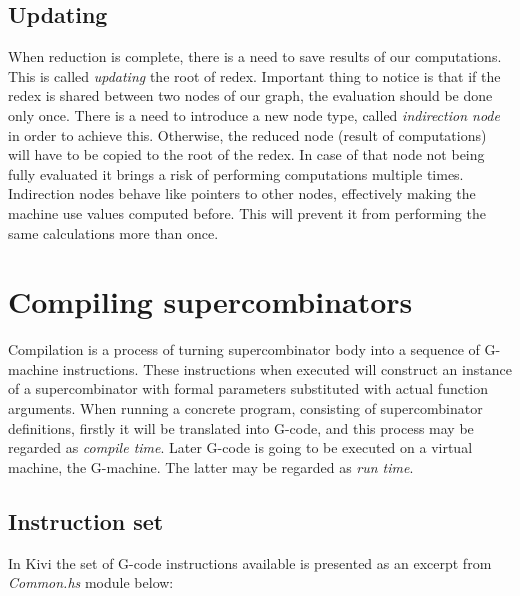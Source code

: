 \documentclass[12pt,a4paper]{report}
\begin{document}
\subsection{Updating}
\label{sec:updating}
When reduction is complete, there is a need to save results of our
computations. This is called \textit{updating} the root of redex. Important
thing to notice is that if the redex is shared between two nodes of our graph,
the evaluation should be done only once. There is a need to introduce a new
node type, called \textit{indirection node} in order to achieve this.
Otherwise, the reduced node (result of computations) will have to be copied to
the root of the redex. In case of that node not being fully evaluated it brings
a risk of performing computations multiple times. Indirection nodes behave like
pointers to other nodes, effectively making the machine use values computed
before. This will prevent it from performing the same calculations more than
once.

%
%
%

\section{Compiling supercombinators}
Compilation is a process of turning supercombinator body into a sequence of
G-machine instructions. These instructions when executed will construct an
instance of a supercombinator with formal parameters substituted with actual
function arguments. When running a concrete program, consisting of
supercombinator definitions, firstly it will be translated into G-code, and this
process may be regarded as \textit{compile time}. Later G-code is going to be
executed on a virtual machine, the G-machine. The latter may be regarded as
\textit{run time}.


\subsection{Instruction set}
In Kivi the set of G-code instructions available is presented as an excerpt
from \textit{Common.hs} module below:
\end{document}
